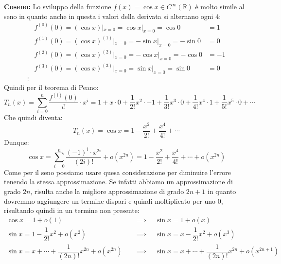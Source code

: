 \textbf{Coseno:} Lo sviluppo della funzione $f(x) = \cos{x} \in C^\infty(\mathbb{R})$ è molto simile al seno in quanto anche in questa i valori della derivata si alternano ogni 4:
\begin{align*}
	&f^{(0)}(0) = (\cos{x}) |_{x = 0} = \cos{x} |_{x = 0} = \cos{0} &= 1\\[5pt]
	&f^{(1)}(0) = (\cos{x})^{(1)}|_{x = 0} = -\sin{x} |_{x = 0} = -\sin{0} &= 0\\[5pt]
	&f^{(2)}(0) = (\cos{x})^{(2)} |_{x = 0} = -\cos{x} |_{x = 0} = -\cos{0} &= -1\\[5pt]
	&f^{(3)}(0) = (\cos{x})^{(3)} |_{x = 0} = \sin{x} |_{x = 0} = \sin{0} &= 0\\
	\vdots
\end{align*}
Quindi per il teorema di Peano:
\begin{equation*}
	T_n(x) = \sum \limits_{i = 0}^n \dfrac{f^{(i)}(0)}{i!} \cdot x^i = 1 + x \cdot 0 + \dfrac{1}{2!}x^2 \cdot -1 + \dfrac{1}{3!}x^3 \cdot 0 + \dfrac{1}{4!}x^4 \cdot 1 + \dfrac{1}{5!}x^5 \cdot 0 + \cdots 
\end{equation*}
Che quindi diventa:
\begin{equation*}
	T_n(x) = \cos{x} = 1 - \dfrac{x^2}{2!} + \dfrac{x^4}{4!} + \cdots
\end{equation*}
Dunque:
\begin{equation*}
	\cos{x} = \sum \limits_{i = 0}^n \dfrac{(-1)^i \cdot x^{2i}}{(2i)!} + o(x^{2n}) = 1 - \dfrac{x^2}{2!} + \dfrac{x^4}{4!} + \cdots + o(x^{2n})
\end{equation*}
Come per il seno possiamo usare quesa considerazione per diminuire l'errore tenendo la stessa approssimazione. Se infatti abbiamo un approssimazione di grado $2n$, risulta anche la migliore approssimazione di grado $2n + 1$ in quanto dovremmo aggiungere un termine dispari e quindi moltiplicato per uno 0, risultando quindi in un termine non presente:
\begin{align*}
	\cos{x} = 1 + o(1) \quad &\implies \quad \sin{x} = 1 + o(x)\\[5pt]
	\sin{x} = 1 - \dfrac{1}{2!}x^2 + o(x^2) \quad &\implies \quad \sin{x} = x - \dfrac{1}{2!}x^2 + o(x^3) \\[5pt]
	\sin{x} = x + \cdots + \dfrac{1}{(2n)!} x^{2n} + o(x^{2n}) \quad &\implies \quad \sin{x} = x + \cdots + \dfrac{1}{(2n)!} x^{2n} + o(x^{2n+1})
\end{align*}

